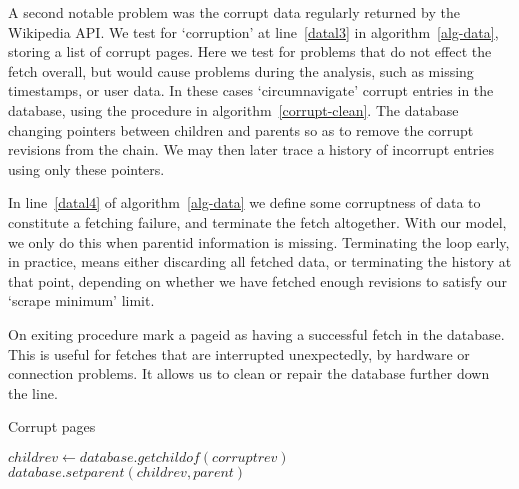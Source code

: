 A second notable problem was the corrupt data regularly returned by
the Wikipedia API. We test for `corruption' at line~\ref{datal3} in
algorithm~\ref{alg-data}, storing a list of corrupt pages. Here we test
for problems that do not effect the fetch overall, but would cause
problems during the analysis, such as missing timestamps, or user
data. In these cases `circumnavigate' corrupt entries in the database,
using the procedure in algorithm~\ref{corrupt-clean}. The database
changing pointers between children and parents so as to remove the
corrupt revisions from the chain. We may then later trace a history of
incorrupt entries using only these pointers.

In line~\ref{datal4} of algorithm~\ref{alg-data} we define some
corruptness of data to constitute a fetching failure, and terminate
the fetch altogether. With our model, we only do this when parentid
information is missing. Terminating the loop early, in practice, means
either discarding all fetched data, or terminating the history at that
point, depending on whether we have fetched enough revisions to
satisfy our `scrape minimum' limit.

On exiting procedure mark a pageid as having a successful fetch in the
database. This is useful for fetches that are interrupted
unexpectedly, by hardware or connection problems. It allows us to
clean or repair the database further down the line.

\begin{algorithm}
  \caption{Corrupt pages}\label{corrupt-clean}
  \begin{algorithmic}
    \State $childrev \gets database.getchildof(corruptrev)$
    \State $database.setparent(childrev, parent)$ 
    \EndProcedure
  \end{algorithmic}
\end{algorithm}

